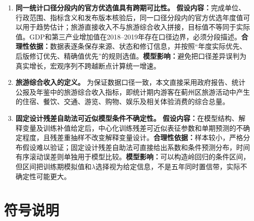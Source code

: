 \documentclass[withoutpreface,bwprint]{cumcmthesis}
\begin{document}
\begin{enumerate}
\item \textbf{同一统计口径分段内的官方优选值具有跨期可比性。} \textbf{假设内容：}完成单位、行政范围、指标含义和发布版本核验后，同一口径分段内的官方优选年度值可以用于趋势估计；旅游直接收入不与旅游综合收入拼接，目标值不等同于实际值。GDP和第三产业增加值在2018--2019年存在口径边界，必须分段描述。\textbf{合理性依据：}数据表逐条保存来源、状态和修订信息，并按照“年度实际优先、后版修订优先、精确值优先”的规则选值。\textbf{模型影响：}避免把口径差异误判为真实增长，宏观序列不跨越断点计算统一增速。


\item \textbf{旅游综合收入的定义。} 为保证数据口径一致，本文直接采用政府报告、统计公报及年鉴中的旅游综合收入指标，即统计期内游客在蓟州区旅游活动中产生的住宿、餐饮、交通、游览、购物、娱乐及相关体验消费的综合总量。

\item \textbf{固定设计残差自助法可近似模型条件不确定性。} \textbf{假设内容：}在模型结构、解释变量及训练补值给定后，中心化训练残差可近似表征参数和单期预测的不确定程度，且残差重抽样不改变解释变量设计。\textbf{合理性依据：}样本较小，严格分布假设难以验证；固定设计残差自助法可直接给出系数和条件预测分布，时间有序滚动误差则单独用于模型比较。\textbf{模型影响：}可以构造岭回归的条件区间，但区间把训练期模拟值和$\lambda$选择视为给定信息，不是五年同时置信带，实际不确定性可能更大。

\end{enumerate}


\section{符号说明}
\end{document}
